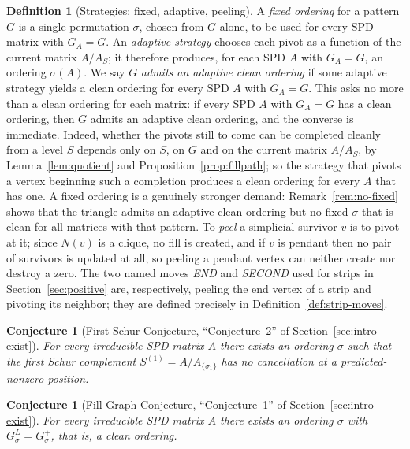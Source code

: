 \documentclass[11pt]{article}
\theoremstyle{plain}
\newtheorem{conjecture}[theorem]{Conjecture}
\theoremstyle{definition}
\newtheorem{definition}[theorem]{Definition}
\theoremstyle{remark}
\begin{document}
\begin{aiblock}
\begin{definition}[Strategies: fixed, adaptive, peeling]\label{def:strategy}
A \emph{fixed ordering} for a pattern $G$ is a single permutation $\sigma$, chosen from $G$ alone, to
be used for every SPD matrix with $G_A=G$. An \emph{adaptive strategy} chooses each pivot as a
function of the current matrix $A/A_S$; it therefore produces, for each SPD $A$ with $G_A=G$, an
ordering $\sigma(A)$. We say $G$ \emph{admits an adaptive clean ordering} if some adaptive strategy
yields a clean ordering for every SPD $A$ with $G_A=G$. This asks no more than a clean ordering for
each matrix: if every SPD $A$ with $G_A=G$ has a clean ordering, then $G$ admits an adaptive clean
ordering, and the converse is immediate. Indeed, whether the pivots still to come can be completed
cleanly from a level $S$ depends only on $S$, on $G$ and on the current matrix $A/A_S$, by
Lemma~\ref{lem:quotient} and Proposition~\ref{prop:fillpath}; so the strategy that pivots a vertex
beginning such a completion produces a clean ordering for every $A$ that has one. A fixed ordering
is a genuinely stronger demand: Remark~\ref{rem:no-fixed} shows that the triangle admits an adaptive
clean ordering but no fixed $\sigma$ that is clean for all matrices with that pattern. To \emph{peel} a simplicial survivor $v$ is to pivot at it; since
$N(v)$ is a clique, no fill is created, and if $v$ is pendant then no pair of survivors is updated at
all, so peeling a pendant vertex can neither create nor destroy a zero. The two named moves
\emph{END} and \emph{SECOND} used for strips in Section~\ref{sec:positive} are, respectively, peeling
the end vertex of a strip and pivoting its neighbor; they are defined precisely in
Definition~\ref{def:strip-moves}.
\end{definition}

\begin{conjecture}[First-Schur Conjecture, ``Conjecture~2'' of Section~\ref{sec:intro-exist}]\label{conj:2}
For every irreducible SPD matrix $A$ there exists an ordering $\sigma$ such that the first Schur
complement $S^{(1)}=A/A_{\{\sigma_1\}}$ has no cancellation at a predicted-nonzero position.
\end{conjecture}

\begin{conjecture}[Fill-Graph Conjecture, ``Conjecture~1'' of Section~\ref{sec:intro-exist}]\label{conj:1}
For every irreducible SPD matrix $A$ there exists an ordering $\sigma$ with $G^L_\sigma=G^+_\sigma$,
that is, a clean ordering.
\end{conjecture}


\end{aiblock}
\end{document}
